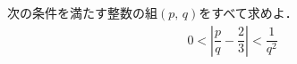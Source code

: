 \documentclass[../../main.tex]{subfiles}
\begin{document}
次の条件を満たす整数の組$(p, \, q)$をすべて求めよ．
\begin{align}
  0<\left| \dfrac{p}{q}-\dfrac{2}{3} \right|<\dfrac{1}{q^2}
\end{align}
\end{document}
